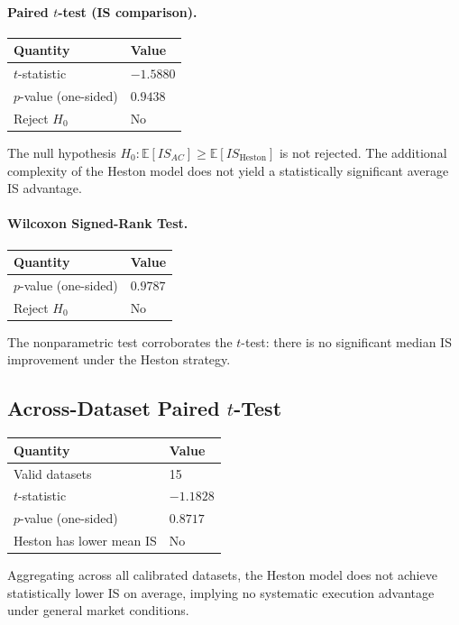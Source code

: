 \documentclass[11pt]{article}
\begin{document}
\paragraph{Paired $t$-test (IS comparison).}
\begin{center}
\begin{tabular}{ll}
\toprule
Quantity & Value \\
\midrule
$t$-statistic & $-1.5880$ \\
$p$-value (one-sided) & $0.9438$ \\
Reject $H_0$ & No \\
\bottomrule
\end{tabular}
\end{center}
The null hypothesis $H_0: \mathbb{E}[IS_{AC}] \ge \mathbb{E}[IS_{\text{Heston}}]$ is not rejected. The additional complexity of the Heston model does not yield a statistically significant average IS advantage.

\paragraph{Wilcoxon Signed-Rank Test.}
\begin{center}
\begin{tabular}{ll}
\toprule
Quantity & Value \\
\midrule
$p$-value (one-sided) & $0.9787$ \\
Reject $H_0$ & No \\
\bottomrule
\end{tabular}
\end{center}
The nonparametric test corroborates the $t$-test: there is no significant median IS improvement under the Heston strategy.

\subsection{Across-Dataset Paired $t$-Test}

\begin{center}
\begin{tabular}{ll}
\toprule
Quantity & Value \\
\midrule
Valid datasets & 15 \\
$t$-statistic & $-1.1828$ \\
$p$-value (one-sided) & $0.8717$ \\
Heston has lower mean IS & No \\
\bottomrule
\end{tabular}
\end{center}
Aggregating across all calibrated datasets, the Heston model does not achieve statistically lower IS on average, implying no systematic execution advantage under general market conditions.
\end{document}
